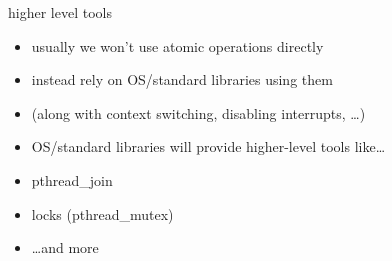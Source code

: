 \begin{frame}{higher level tools}
    \begin{itemize}
        \item usually we won't use atomic operations directly
        \item instead rely on OS/standard libraries using them
        \item (along with context switching, disabling interrupts, \ldots)
        \item OS/standard libraries will provide higher-level tools like\ldots
            \vspace{.5cm}
        \item pthread\_join
        \item locks (pthread\_mutex)
        \item \ldots and more
    \end{itemize}
\end{frame}
